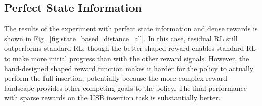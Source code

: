 \subsection{Perfect State Information}
The results of the experiment with perfect state information and dense rewards is shown in Fig.~\ref{fig:state_based_distance_all}. In this case, residual RL still outperforms standard RL, though the better-shaped reward enables standard RL to make more initial progress than with the other reward signals.
However, the hand-designed shaped reward function makes it harder for the policy to actually perform the full insertion, potentially because the more complex reward landscape provides other competing goals to the policy. The final performance with sparse rewards on the USB insertion task is substantially better.


\begin{figure}[tbp]
    \centering
\end{figure}

